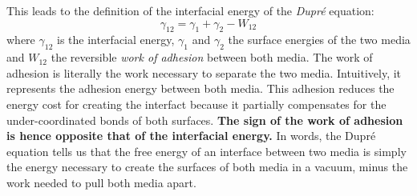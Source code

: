 \documentclass[a4paper, 11pt, normalem]{report}
\begin{document}
This leads to the definition of the interfacial energy of the \textit{Dupr\'{e}} equation:
\begin{equation}
    \gamma_{12} = \gamma_1 + \gamma_2 - W_{12}
\end{equation}
where $\gamma_{12}$ is the interfacial energy, $\gamma_1$ and $\gamma_2$ the surface energies of the two media and $W_{12}$ the reversible \textit{work of adhesion} between both media.
The work of adhesion is literally the work necessary to separate the two media.
Intuitively, it represents the adhesion energy between both media.
This adhesion reduces the energy cost for creating the interfact because it partially compensates for the under-coordinated bonds of both surfaces.
\textbf{The sign of the work of adhesion is hence opposite that of the interfacial energy.}
In words, the Dupr\'{e} equation tells us that the free energy of an interface between two media is simply the energy necessary to create the surfaces of both media in a vacuum, minus the work needed to pull both media apart.
\end{document}
